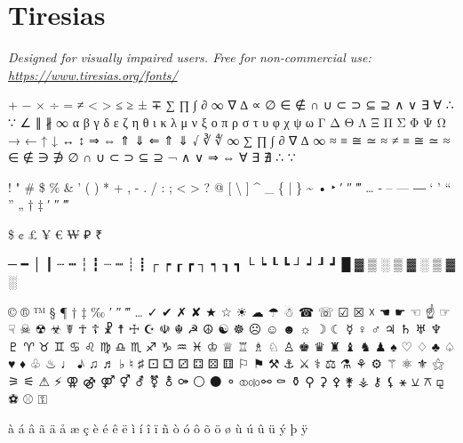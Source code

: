 \section{Tiresias}
\emph{Designed for visually impaired users. Free for non-commercial use: \url{https://www.tiresias.org/fonts/}}
\begin{raggedright}

+ − × ÷ = ≠ < > ≤ ≥ ± ∓
∑ ∏ ∫ ∂ ∞ ∇ ∆ ∝ ∅ ∈ ∉ ∩ ∪ ⊂ ⊃ ⊆ ⊇ ∧ ∨ ∃ ∀ ∴ ∵ ∠ ∥ ∦ ∞
α β γ δ ε ζ η θ ι κ λ μ ν ξ ο π ρ σ τ υ φ χ ψ ω
Γ Δ Θ Λ Ξ Π Σ Φ Ψ Ω
→ ← ↑ ↓ ↔ ↕ ⇒ ⇔ ⇑ ⇓ ⇐ ⇑ ⇓
√ ∛ ∜ ∞ ∑ ∏ ∫ ∂ ∇ ∆ ∞ ≈ ≡ ≅ ≃ ≈ ≠ ≡ ≅ ≃ ≈
∈ ∉ ∋ ∌ ∅ ∩ ∪ ⊂ ⊃ ⊆ ⊇
¬ ∧ ∨ ⇒ ⇔ ∀ ∃ ∄ ∴ ∵

! " \# \$ \% \& ' ( ) * + , - . / : ; \textless{} \textgreater{} ? @ [ \textbackslash{} ] \^{} \_ \{ | \} \~{}
• ‣ ′ ″ ‴ … ‐ – — ― ‘ ’ “ ” „ † ‡ ′ ″ ‴

\$ ¢ £ ¥ € ₩ ₽ ₹

─ ━ │ ┃ ┄ ┅ ┆ ┇ ┈ ┉ ┊ ┋ ┌ ┍ ┎ ┏ ┐ ┑ ┒ ┓ └ ┕ ┖ ┗ ┘ ┙ ┚ ┛
█ ▓ ▒ ░ ▒ ▓ ░ ▒ ▓ ░

© ® ™ § ¶ † ‡ ‰ ′ ″ ‴ … ✓ ✔ ✗ ✘ ★ ☆ ☀ ☁ ☂ ☃ ☎ ☏ ☑ ☒ ☓ ☚ ☛ ☜ ☝ ☞ ☟ ☠ ☢ ☣ ☤ ☥ ☦ ☧ ☨ ☩ ☪ ☫ ☬ ☭ ☮ ☯ ☸ ☹ ☺ ☻ ☼ ☽ ☾ ☿ ♀ ♂ ♃ ♄ ♅ ♆ ♇ ♈ ♉ ♊ ♋ ♌ ♍ ♎ ♏ ♐ ♑ ♒ ♓ ♔ ♕ ♖ ♗ ♘ ♙ ♚ ♛ ♜ ♝ ♞ ♟ ♠ ♡ ♢ ♣ ♤ ♥ ♦ ♧ ♨ ♩ ♪ ♫ ♬ ♭ ♮ ♯ ⚀ ⚁ ⚂ ⚃ ⚄ ⚅ ⚐ ⚑ ⚒ ⚓ ⚔ ⚕ ⚖ ⚗ ⚘ ⚙ ⚚ ⚛ ⚜ ⚝ ⚞ ⚟ ⚠ ⚡ ⚢ ⚣ ⚤ ⚥ ⚦ ⚧ ⚨ ⚩ ⚪ ⚫ ⚬ ⚭ ⚮ ⚯ ⚰ ⚱ ⚲ ⚳ ⚴ ⚵ ⚶ ⚷ ⚸ ⚹ ⚺ ⚻ ⚼ ⚽ ⚾ ⚿

à á â ã ä å æ ç è é ê ë ì í î ï ñ ò ó ô õ ö ø ù ú û ü ý þ ÿ
\end{raggedright}

